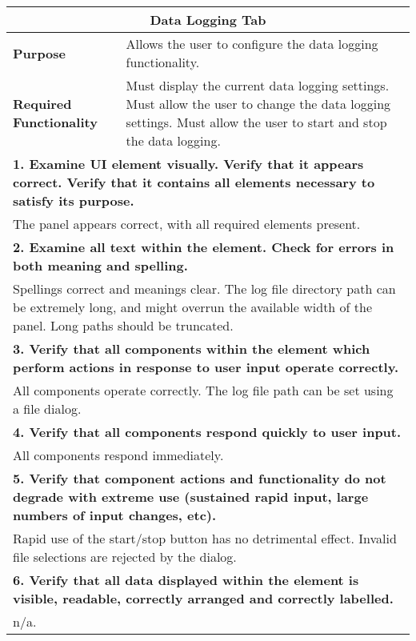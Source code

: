 \begin{longtable}{ l p{10cm} }
 \hline
 \multicolumn{2}{c}{\textbf{Data Logging Tab}}\\
 \hline
 \textbf{Purpose} & Allows the user to configure the data logging functionality.\\
 \textbf{Required Functionality} & Must display the current data logging settings. Must allow the user to change the data logging settings. Must allow the user to start and stop the data logging.\\
 \hline
 \multicolumn{2}{p{14cm}}{\textbf{1. Examine UI element visually. Verify that it appears correct. Verify that it contains all elements necessary to satisfy its purpose.}}\\
 \multicolumn{2}{p{14cm}}{The panel appears correct, with all required elements present.}\\
 \hline
 \multicolumn{2}{p{14cm}}{\textbf{2. Examine all text within the element. Check for errors in both meaning and spelling.}}\\
 \multicolumn{2}{p{14cm}}{Spellings correct and meanings clear. The log file directory path can be extremely long, and might overrun the available width of the panel. Long paths should be truncated.}\\
 \hline
 \multicolumn{2}{p{14cm}}{\textbf{3. Verify that all components within the element which perform actions in response to user input operate correctly.}}\\
 \multicolumn{2}{p{14cm}}{All components operate correctly. The log file path can be set using a file dialog.}\\
 \hline
 \multicolumn{2}{p{14cm}}{\textbf{4. Verify that all components respond quickly to user input.}}\\
 \multicolumn{2}{p{14cm}}{All components respond immediately.}\\
 \hline
 \multicolumn{2}{p{14cm}}{\textbf{5. Verify that component actions and functionality do not degrade with extreme use (sustained rapid input, large numbers of input changes, etc).}}\\
 \multicolumn{2}{p{14cm}}{Rapid use of the start/stop button has no detrimental effect. Invalid file selections are rejected by the dialog.}\\
 \hline
 \multicolumn{2}{p{14cm}}{\textbf{6. Verify that all data displayed within the element is visible, readable, correctly arranged and correctly labelled.}}\\
 \multicolumn{2}{p{14cm}}{n/a.}\\

\end{longtable}
